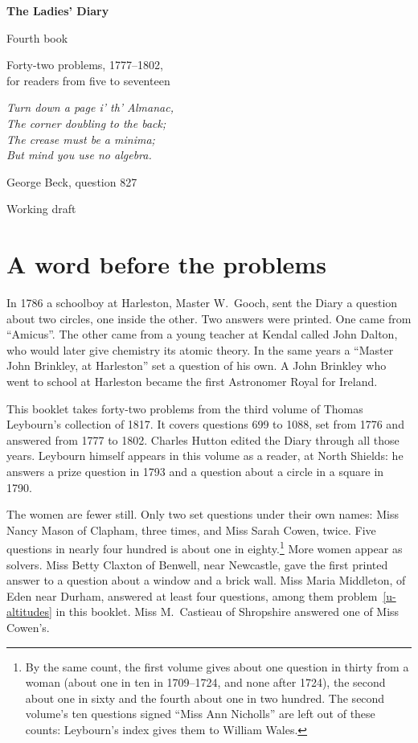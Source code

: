 \documentclass[11pt,a4paper]{article}
\newcounter{prob}
\begin{document}
\begin{titlepage}
\centering
\vspace*{3cm}
{\Huge\bfseries The Ladies' Diary\par}
\vspace{0.4cm}
{\LARGE Fourth book\par}
\vspace{0.8cm}
{\Large Forty-two problems, 1777--1802,\\ for readers from five to seventeen\par}
\vspace{2cm}
{\large\itshape Turn down a page i' th' Almanac,\\
The corner doubling to the back;\\
The crease must be a minima;\\
But mind you use no algebra.\par}
\vspace{0.3cm}
{\small George Beck, question 827\par}
\vfill
{\large Working draft\par}
\end{titlepage}

\section*{A word before the problems}

In 1786 a schoolboy at Harleston, Master W.~Gooch, sent the Diary a question about two
circles, one inside the other. Two answers were printed. One came from ``Amicus''. The
other came from a young teacher at Kendal called John Dalton, who would later give
chemistry its atomic theory. In the same years a ``Master John Brinkley, at Harleston''
set a question of his own. A John Brinkley who went to school at Harleston became the
first Astronomer Royal for Ireland.

This booklet takes forty-two problems from the third volume of Thomas Leybourn's
collection of 1817. It covers questions 699 to 1088, set from 1776 and answered from
1777 to 1802. Charles Hutton edited the Diary through all those years. Leybourn himself
appears in this volume as a reader, at North Shields: he answers a prize question in
1793 and a question about a circle in a square in 1790.

The women are fewer still. Only two set questions under their own names: Miss Nancy
Mason of Clapham, three times, and Miss Sarah Cowen, twice. Five questions in nearly
four hundred is about one in eighty.\footnote{By the same count, the first volume gives
about one question in thirty from a woman (about one in ten in 1709--1724, and none
after 1724), the second about one in sixty and the fourth about one in two hundred.
The second volume's ten questions signed ``Miss Ann Nicholls'' are left out of these
counts: Leybourn's index gives them to William Wales.} More women appear as solvers. Miss Betty Claxton of
Benwell, near Newcastle, gave the first printed answer to a question about a window
and a brick wall. Miss Maria Middleton, of Eden near Durham, answered at least four
questions, among them problem~\ref{u-altitudes} in this booklet. Miss M.~Castieau of Shropshire answered one of
Miss Cowen's.
\end{document}
